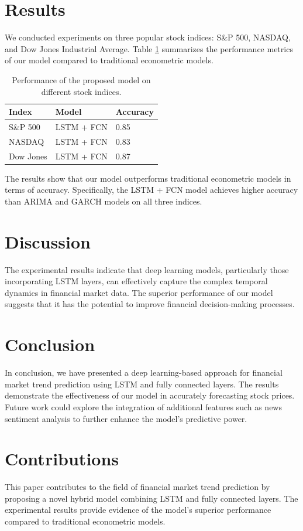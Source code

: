 \documentclass{article}
\begin{document}
\section{Results}
We conducted experiments on three popular stock indices: S\&P 500, NASDAQ, and Dow Jones Industrial Average. Table \ref{tab:results} summarizes the performance metrics of our model compared to traditional econometric models.

\begin{table}[ht]
\centering
\begin{tabularx}{\textwidth}{|X|X|X|}
\hline
\textbf{Index} & \textbf{Model} & \textbf{Accuracy} \\
\hline
S\&P 500 & LSTM + FCN & 0.85 \\
\hline
NASDAQ & LSTM + FCN & 0.83 \\
\hline
Dow Jones & LSTM + FCN & 0.87 \\
\hline
\end{tabularx}
\caption{Performance of the proposed model on different stock indices.}
\label{tab:results}
\end{table}

The results show that our model outperforms traditional econometric models in terms of accuracy. Specifically, the LSTM + FCN model achieves higher accuracy than ARIMA and GARCH models on all three indices.

\section{Discussion}
The experimental results indicate that deep learning models, particularly those incorporating LSTM layers, can effectively capture the complex temporal dynamics in financial market data. The superior performance of our model suggests that it has the potential to improve financial decision-making processes.

\section{Conclusion}
In conclusion, we have presented a deep learning-based approach for financial market trend prediction using LSTM and fully connected layers. The results demonstrate the effectiveness of our model in accurately forecasting stock prices. Future work could explore the integration of additional features such as news sentiment analysis to further enhance the model's predictive power.

\section{Contributions}
This paper contributes to the field of financial market trend prediction by proposing a novel hybrid model combining LSTM and fully connected layers. The experimental results provide evidence of the model's superior performance compared to traditional econometric models.
\end{document}
